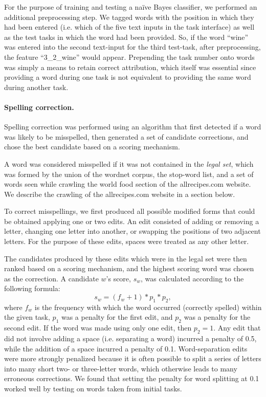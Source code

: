 \documentclass[12pt]{article}
\begin{document}
	For the purpose of training and testing a na\"ive Bayes classifier, we 
	performed an additional preprocessing step.  We tagged words with the
	position in which they had been entered (i.e. which of the five text 
	inputs in the task interface) as well as the test tasks in which the word 
	had been provided.
	So, if the word ``wine'' was entered into the second text-input for 
	the third test-task, after preprocessing, the feature ``3\_2\_wine'' would
	appear.  Prepending the task number onto words was simply a means to 
	retain correct attribution, which itself was essential since providing a
	word during one task is not equivalent to providing the same word during 
	another task.  
	
	\paragraph{Spelling correction.}  
	Spelling correction was performed using an algorithm that first detected
	if a word was likely to be misspelled, then generated a set of candidate 
	corrections, and chose the best candidate based on a scoring mechanism.
	
	A word was considered misspelled if it was not contained in the 
	\textit{legal set}, which was formed by the union of
	the wordnet corpus, the stop-word list, and a set of words seen while 
	crawling the world food section of the allrecipes.com website.  We
	describe the crawling of the allrecipes.com website in a section below.

	To correct misspellings, we first produced all possible modified forms 
	that could be obtained applying one or two edits.  An edit consisted of 
	adding or removing a letter, changing one letter into another, or 
	swapping the positions of two adjacent letters.  For the purpose of these 
	edits, spaces were treated as any other letter.

	The candidates produced by these edits which were in the legal set were
	then ranked based on a scoring mechanism, and the highest scoring word
	was chosen as the correction.  A candidate $w$'s score, $s_w$, was 
	calculated according to the following formula:
	\begin{equation}
		s_w = (f_w + 1) * p_1 * p_2,
	\end{equation}
	where $f_w$ is the frequency with which the word occurred (correctly 
	spelled)
	within the given task, $p_1$ was a penalty for the first edit, and
	$p_2$ was a penalty for the second edit.  If the word was made using only
	one edit, then $p_2 = 1$.  Any edit that did not involve adding a space
	(i.e. separating a word) incurred a penalty of 0.5, while the addition of
	a space incurred a penalty of 0.1.  Word-separation edits were more 
	strongly penalized because it is often possible to split a series of 
	letters into many short two- or three-letter words, which otherwise leads 
	to many erroneous corrections.  We found that setting the penalty for
	word splitting at 0.1 worked well by testing on words taken from
	initial tasks.
\end{document}
